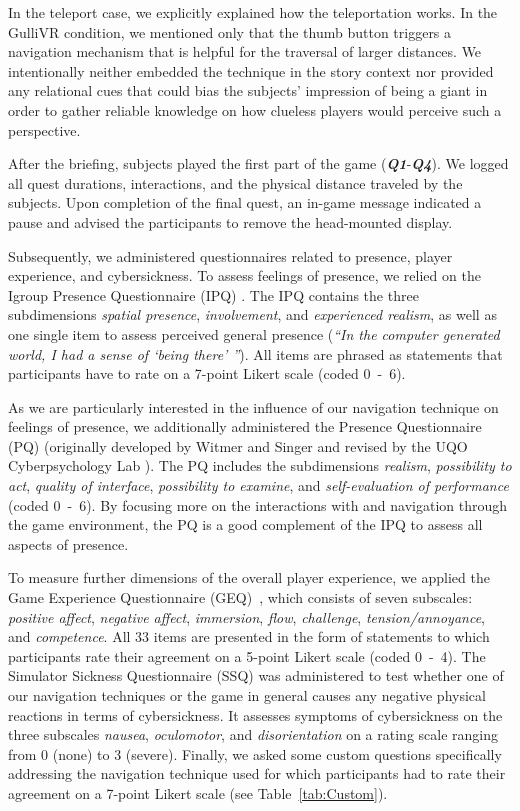 \documentclass{sigchi}
\begin{document}
In the teleport case, we explicitly explained how the teleportation works. In the GulliVR condition, we mentioned only that the thumb button triggers a navigation mechanism that is helpful for the traversal of larger distances. We intentionally neither embedded the technique in the story context nor provided any relational cues that could bias the subjects' impression of being a giant in order to gather reliable knowledge on how clueless players would perceive such a perspective.



After the briefing, subjects played the first part of the game (\textit{\textbf{Q1}}-\textit{\textbf{Q4}}). We logged all quest durations, interactions, and the physical distance traveled by the subjects. Upon completion of the final quest, an in-game message indicated a pause and advised the participants to remove the head-mounted display.

Subsequently, we administered questionnaires related to presence, player experience, and cybersickness. To assess feelings of presence, we relied on the Igroup Presence Questionnaire (IPQ) \cite{Schubert.1999b}. The IPQ contains the three subdimensions \textit{spatial presence}, \textit{involvement}, and \textit{experienced realism}, as well as one single item to assess perceived general presence (\textit{``In the computer generated world, I had a sense of `being there' ''}). All items are phrased as statements that participants have to rate on a 7-point Likert scale (coded 0~-~6).

As we are particularly interested in the influence of our navigation technique on feelings of presence, we additionally administered the Presence Questionnaire (PQ) (originally developed by Witmer and Singer \cite{Witmer.1998} and revised by the UQO Cyberpsychology Lab \cite{UQO.2004}). The PQ includes the subdimensions \textit{realism}, \textit{possibility to act}, \textit{quality of interface}, \textit{possibility to examine}, and \textit{self-evaluation of performance} (coded 0~-~6). By focusing more on the interactions with and navigation through the game environment, the PQ is a good complement of the IPQ to assess all aspects of presence.

To measure further dimensions of the overall player experience, we applied the Game Experience Questionnaire (GEQ)~\cite{IJsselsteijn.2013}, which consists of seven subscales: \textit{positive affect}, \textit{negative affect}, \textit{immersion}, \textit{flow}, \textit{challenge}, \textit{tension/annoyance}, and \textit{competence}. All 33 items are presented in the form of statements to which participants rate their agreement on a 5-point Likert scale (coded 0~-~4). The Simulator Sickness Questionnaire (SSQ) \cite{kennedy1993simulator} was administered to test whether one of our navigation techniques or the game in general causes any negative physical reactions in terms of cybersickness. It assesses symptoms of cybersickness on the three subscales \textit{nausea}, \textit{oculomotor}, and \textit{disorientation} on a rating scale ranging from 0 (none) to 3 (severe).
Finally, we asked some custom questions specifically addressing the navigation technique used for which participants had to rate their agreement on a 7-point Likert scale (see Table~\ref{tab:Custom}).
\end{document}
